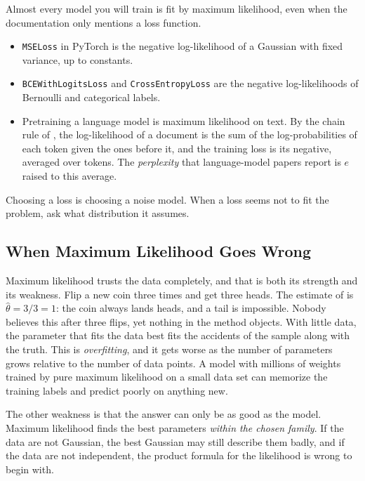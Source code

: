 \begin{aibox}
  Almost every model you will train is fit by maximum likelihood, even
  when the documentation only mentions a loss function.
  \begin{itemize}
    \item \texttt{MSELoss} in PyTorch is the negative log-likelihood of a
      Gaussian with fixed variance, up to constants.
    \item \texttt{BCEWithLogitsLoss} and \texttt{CrossEntropyLoss} are
      the negative log-likelihoods of Bernoulli and categorical labels.
    \item Pretraining a language model is maximum likelihood on text.
      By the chain rule of , the
      log-likelihood of a document is the sum of the log-probabilities
      of each token given the ones before it, and the training loss is
      its negative, averaged over tokens. The \emph{perplexity} that
      language-model papers report is $e$ raised to this average.
  \end{itemize}
  Choosing a loss is choosing a noise model. When a loss seems not to
  fit the problem, ask what distribution it assumes.
\end{aibox}

\subsection{When Maximum Likelihood Goes Wrong}
\label{sec:ch06-mle-limits}

Maximum likelihood trusts the data completely, and that is both its
strength and its weakness. Flip a new coin three times and get three
heads. The estimate of  is $\hat\theta = 3/3
= 1$: the coin always lands heads, and a tail is impossible. Nobody
believes this after three flips, yet nothing in the method objects. With
little data, the parameter that fits the data best fits the accidents
of the sample along with the truth. This is \emph{overfitting}, and it
gets worse as the number of parameters grows relative to the number of
data points. A model with millions of weights trained by pure maximum
likelihood on a small data set can memorize the training labels and
predict poorly on anything new.

The other weakness is that the answer can only be as good as the model.
Maximum likelihood finds the best parameters \emph{within the chosen
family}. If the data are not Gaussian, the best Gaussian may still
describe them badly, and if the data are not independent, the product
formula for the likelihood is wrong to begin with.

